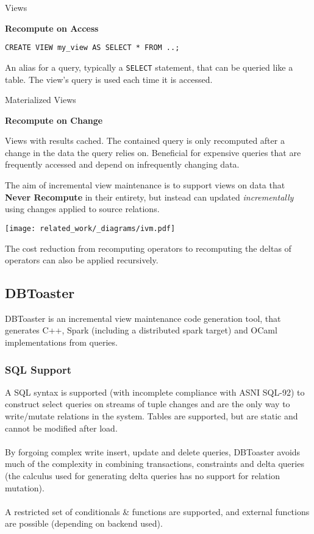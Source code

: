 \begin{tcbraster}[raster columns=2,raster equal height]
    \begin{definitionbox}{Views}
        \centerline{\textbf{Recompute on Access}}
        \begin{verbatim}
CREATE VIEW my_view AS SELECT * FROM ..;            
        \end{verbatim}
        An alias for a query, typically a \texttt{SELECT} statement, that can be queried like a table. The view's query is used each time it is accessed.\cite{Postgres16Docs}
    \end{definitionbox}
    \begin{definitionbox}{Materialized Views}
        \centerline{\textbf{Recompute on Change}}
        Views with results cached. The contained query is only recomputed after a change in the data the query relies on. Beneficial for expensive queries that are frequently accessed and depend on infrequently changing data.
    \end{definitionbox}
\end{tcbraster}
\noindent
The aim of incremental view maintenance is to support views on data that \textbf{Never Recompute} in their entirety, but instead can updated \textit{incrementally} using changes applied to source relations.
\begin{center}
    \texttt{[image: related\_work/\_diagrams/ivm.pdf]}
\end{center}
The cost reduction from recomputing operators to recomputing the deltas of operators can also be applied recursively.

\subsection{DBToaster}
DBToaster is an incremental view maintenance code generation tool, that generates C++, Spark (including a distributed spark target) and OCaml implementations from queries.
\subsubsection{SQL Support}
A SQL syntax is supported (with incomplete compliance with ASNI SQL-92) to construct select queries
on streams\cite{DBToasterSQLReference} of tuple changes and are the only way to write/mutate relations in the system.
Tables are supported, but are static and cannot be modified after load.
\\
\\ By forgoing complex write insert, update and delete queries, DBToaster avoids much of the complexity in combining
transactions, constraints and delta queries (the calculus used for generating delta queries has no support for
relation mutation).
\\
\\ A restricted set of conditionals \& functions are supported, and external functions are possible (depending on backend used).

